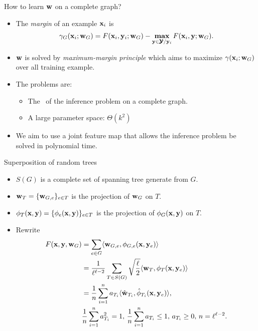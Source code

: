 \documentclass[first=dgreen,second=purple,logo=yellowexc]{aaltoslides}
\begin{document}
%
\begin{frame}{How to learn $\mathbf {w}$ on a complete graph?}
	\begin{itemize}\footnotesize
		\item The \textit{margin} of an example $\mathbf {x}_i$ is
		\begin{align*}
			\gamma_G(\mathbf {x}_i;\mathbf {w}_G) = F(\mathbf {x}_i,\mathbf {y}_i;\mathbf {w}_G) - \underset{\mathbf {y}\in\pmb {\mathcal{Y}}/\mathbf {y}_i}{\textbf{max}}\,F(\mathbf {x}_i,\mathbf {y};\mathbf {w}_G).
		\end{align*}
		\item $\mathbf {w}$ is solved by \textit{maximum-margin principle} which aims to maximize $\gamma(\mathbf {x}_i;\mathbf {w}_G)$ over all training example.
		\item The problems are:
		\begin{itemize}\footnotesize
			\item The \nphardness\ of the inference problem on a complete graph.
			\item A large parameter space: $\Theta(k^2)$
		\end{itemize}
		\item We aim to use a joint feature map that allows the inference problem be solved in polynomial time.
	\end{itemize}
\end{frame}



%
\begin{frame}{Superposition of random trees}
	\begin{itemize}\footnotesize
		\item $S(G)$ is a complete set of spanning tree generate from $G$.
		\item $\mathbf {w}_{T}=\{\mathbf {w}_{G,e}\}_{e\in T}$ is the projection of $\mathbf {w}_G$ on $T$.
		\item $\phi_T(\mathbf {x},\mathbf {y})=\{\phi_e(\mathbf {x},\mathbf {y})\}_{e\in T}$ is the projection of $\phi_G(\mathbf {x},\mathbf {y})$ on $T$.
		\item Rewrite
		\begin{align*}
			F(\mathbf {x},\mathbf {y},\mathbf {w}_G) &= \sum_{e\in G}\langle \mathbf {w}_{G,e}, \phi_{G,e}(\mathbf {x},\mathbf {y}_e) \rangle \\
			& = \frac{1}{\ell^{\ell-2}}\sum_{T\in S(G)}\sqrt{\frac{\ell}{2}}\langle \mathbf {w}_{T}, \phi_{T}(\mathbf {x},\mathbf {y}_e) \rangle\\
			& = \frac{1}{n}\sum_{i = 1}^{n}a_{T_i}\langle \hat{\mathbf {w}}_{T_i}, \hat{\phi}_{T_i}(\mathbf {x},\mathbf {y}_e) \rangle,\\
			& \frac{1}{n}\sum_{i = 1}^{n}a_{T_i}^2=1, \, \frac{1}{n}\sum_{i = 1}^{n}a_{T_i}\le1,\, a_{T_i}\ge0,\, n=\ell^{\ell-2}.
		\end{align*}
	\end{itemize}
\end{frame}
\end{document}
